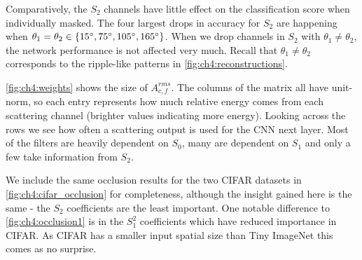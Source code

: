Comparatively, the $S_2$ channels have little effect on the classification score
when individually masked. The four largest drops in accuracy for
$S_2$ are happening when $\theta_1 = \theta_2 \in \{15^{\circ}, 75^{\circ}, 105^{\circ}, 165^{\circ}\}$.
When we drop channels in $S_2$ with $\theta_1 \neq \theta_2$, the network performance is not affected
very much. Recall that $\theta_1 \neq \theta_2$ corresponds to the ripple-like patterns in
\autoref{fig:ch4:reconstructions}.

\autoref{fig:ch4:weights} shows the size of $A^{rms}_{c,f}$. The columns of the matrix all have
unit-norm, so each entry represents how much relative energy comes from each
scattering channel (brighter values indicating more energy). Looking across the rows we see how often a scattering output
is used for the CNN next layer. Most of the filters are heavily dependent on 
$S_0$, many are dependent on $S_1$ and only a few take information from $S_2$.

We include the same occlusion results for the two CIFAR datasets in
\autoref{fig:ch4:cifar_occlusion} for completeness, although the insight gained
here is the same - the $S_2$ coefficients are the least important. One notable difference to
\autoref{fig:ch4:occlusion1} is in the $S_1^2$ coefficients which have reduced importance 
in CIFAR\@. As CIFAR has a smaller input spatial size than Tiny ImageNet this comes as no surprise.


